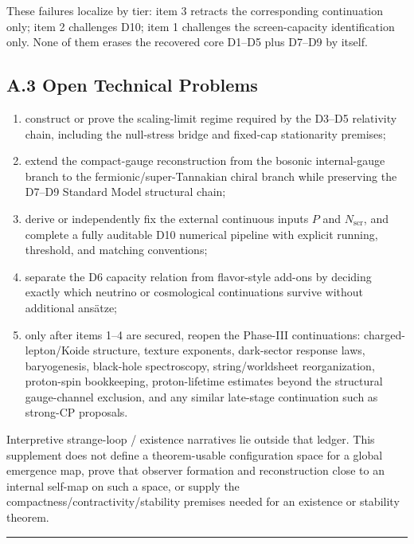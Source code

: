 These failures localize by tier: item 3 retracts the corresponding continuation only; item 2 challenges D10; item 1 challenges the screen-capacity identification only. None of them erases the recovered core D1--D5 plus D7--D9 by itself.

\subsection{A.3 Open Technical Problems}\label{a3-future-directions}

\begin{enumerate}
\item construct or prove the scaling-limit regime required by the D3--D5 relativity chain, including the null-stress bridge and fixed-cap stationarity premises;
\item extend the compact-gauge reconstruction from the bosonic internal-gauge branch to the fermionic/super-Tannakian chiral branch while preserving the D7--D9 Standard Model structural chain;
\item derive or independently fix the external continuous inputs $P$ and $N_{\mathrm{scr}}$, and complete a fully auditable D10 numerical pipeline with explicit running, threshold, and matching conventions;
\item separate the D6 capacity relation from flavor-style add-ons by deciding exactly which neutrino or cosmological continuations survive without additional ans\"atze;
\item only after items 1--4 are secured, reopen the Phase-III continuations: charged-lepton/Koide structure, texture exponents, dark-sector response laws, baryogenesis, black-hole spectroscopy, string/worldsheet reorganization, proton-spin bookkeeping, proton-lifetime estimates beyond the structural gauge-channel exclusion, and any similar late-stage continuation such as strong-CP proposals.
\end{enumerate}

Interpretive strange-loop / existence narratives lie outside that ledger. This supplement does not define a theorem-usable configuration space for a global emergence map, prove that observer formation and reconstruction close to an internal self-map on such a space, or supply the compactness/contractivity/stability premises needed for an existence or stability theorem.

\begin{center}\rule{0.5\linewidth}{0.5pt}\end{center}

